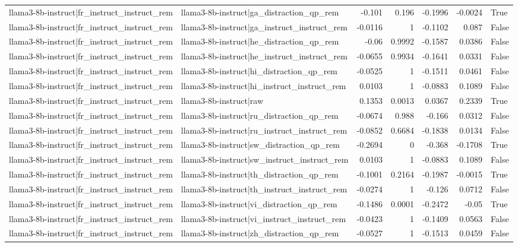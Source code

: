 \begin{table}
\begin{tabular}{l l r r r r l}
llama3-8b-instruct|fr_instruct_instruct_rem & llama3-8b-instruct|ga_distraction_qp_rem & -0.101 & 0.196 & -0.1996 & -0.0024 & True \\
llama3-8b-instruct|fr_instruct_instruct_rem & llama3-8b-instruct|ga_instruct_instruct_rem & -0.0116 & 1 & -0.1102 & 0.087 & False \\
llama3-8b-instruct|fr_instruct_instruct_rem & llama3-8b-instruct|he_distraction_qp_rem & -0.06 & 0.9992 & -0.1587 & 0.0386 & False \\
llama3-8b-instruct|fr_instruct_instruct_rem & llama3-8b-instruct|he_instruct_instruct_rem & -0.0655 & 0.9934 & -0.1641 & 0.0331 & False \\
llama3-8b-instruct|fr_instruct_instruct_rem & llama3-8b-instruct|hi_distraction_qp_rem & -0.0525 & 1 & -0.1511 & 0.0461 & False \\
llama3-8b-instruct|fr_instruct_instruct_rem & llama3-8b-instruct|hi_instruct_instruct_rem & 0.0103 & 1 & -0.0883 & 0.1089 & False \\
llama3-8b-instruct|fr_instruct_instruct_rem & llama3-8b-instruct|raw & 0.1353 & 0.0013 & 0.0367 & 0.2339 & True \\
llama3-8b-instruct|fr_instruct_instruct_rem & llama3-8b-instruct|ru_distraction_qp_rem & -0.0674 & 0.988 & -0.166 & 0.0312 & False \\
llama3-8b-instruct|fr_instruct_instruct_rem & llama3-8b-instruct|ru_instruct_instruct_rem & -0.0852 & 0.6684 & -0.1838 & 0.0134 & False \\
llama3-8b-instruct|fr_instruct_instruct_rem & llama3-8b-instruct|sw_distraction_qp_rem & -0.2694 & 0 & -0.368 & -0.1708 & True \\
llama3-8b-instruct|fr_instruct_instruct_rem & llama3-8b-instruct|sw_instruct_instruct_rem & 0.0103 & 1 & -0.0883 & 0.1089 & False \\
llama3-8b-instruct|fr_instruct_instruct_rem & llama3-8b-instruct|th_distraction_qp_rem & -0.1001 & 0.2164 & -0.1987 & -0.0015 & True \\
llama3-8b-instruct|fr_instruct_instruct_rem & llama3-8b-instruct|th_instruct_instruct_rem & -0.0274 & 1 & -0.126 & 0.0712 & False \\
llama3-8b-instruct|fr_instruct_instruct_rem & llama3-8b-instruct|vi_distraction_qp_rem & -0.1486 & 0.0001 & -0.2472 & -0.05 & True \\
llama3-8b-instruct|fr_instruct_instruct_rem & llama3-8b-instruct|vi_instruct_instruct_rem & -0.0423 & 1 & -0.1409 & 0.0563 & False \\
llama3-8b-instruct|fr_instruct_instruct_rem & llama3-8b-instruct|zh_distraction_qp_rem & -0.0527 & 1 & -0.1513 & 0.0459 & False \\

\end{tabular}
\end{table}
